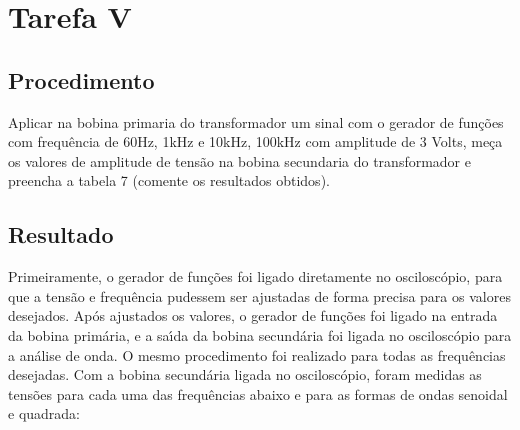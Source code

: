 
\section{Tarefa V}
\subsection{Procedimento}
Aplicar na bobina primaria do transformador um sinal com o gerador de fun\c{c}\~{o}es com frequ\^{e}ncia de 60Hz, 1kHz e 10kHz, 100kHz com amplitude de 3 Volts, me\c{c}a os valores de amplitude de tens\~{a}o na bobina secundaria do transformador e preencha a tabela 7 (comente os resultados obtidos).
\subsection{Resultado}
Primeiramente, o gerador de fun\c{c}\~{o}es foi ligado diretamente no oscilosc\'{o}pio, para que a tens\~{a}o e frequ\^{e}ncia pudessem ser ajustadas de forma precisa para os valores desejados. Ap\'{o}s ajustados os valores, o gerador de fun\c{c}\~{o}es foi ligado na entrada da bobina prim\'{a}ria, e a sa\'{\i}da da bobina secund\'{a}ria foi ligada no oscilosc\'{o}pio para a an\'{a}lise de onda. O mesmo procedimento foi realizado para todas as frequ\^{e}ncias desejadas. Com a bobina secund\'{a}ria ligada no oscilosc\'{o}pio, foram medidas as tens\~{o}es para cada uma das frequ\^{e}ncias abaixo e para as formas de ondas senoidal e quadrada: \\

